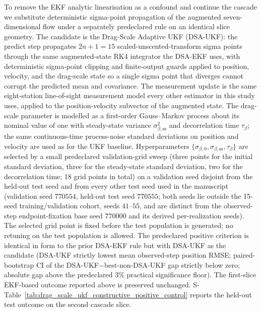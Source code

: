 \documentclass{article}
\begin{document}
To remove the EKF analytic linearisation as a confound and continue the cascade we substitute deterministic sigma-point propagation of the augmented seven-dimensional flow under a separately predeclared rule on an identical slice geometry. The candidate is the Drag-Scale Adaptive UKF (DSA-UKF): the predict step propagates $2n{+}1=15$ scaled-unscented-transform sigma points through the same augmented-state RK4 integrator the DSA-EKF uses, with deterministic sigma-point clipping and finite-output guards applied to position, velocity, and the drag-scale state so a single sigma point that diverges cannot corrupt the predicted mean and covariance. The measurement update is the same eight-station line-of-sight measurement model every other estimator in this study uses, applied to the position-velocity subvector of the augmented state. The drag-scale parameter is modelled as a first-order Gauss--Markov process about its nominal value of one with steady-state variance $\sigma_{\beta,\mathrm{ss}}^{2}$ and decorrelation time $\tau_{\beta}$; the same continuous-time process-noise standard deviations on position and velocity are used as for the UKF baseline. Hyperparameters $\{\sigma_{\beta,0},\sigma_{\beta,\mathrm{ss}},\tau_{\beta}\}$ are selected by a small predeclared validation-grid sweep (three points for the initial standard deviation, three for the steady-state standard deviation, two for the decorrelation time; 18 grid points in total) on a validation seed disjoint from the held-out test seed and from every other test seed used in the manuscript (validation seed $770554$, held-out test seed $770555$; both seeds lie outside the 15-seed training/validation cohort, seeds $41$--$55$, and are distinct from the observed-step endpoint-fixation base seed $770000$ and its derived per-realization seeds). The selected grid point is fixed before the test population is generated; no retuning on the test population is allowed. The predeclared positive criterion is identical in form to the prior DSA-EKF rule but with DSA-UKF as the candidate (DSA-UKF strictly lowest mean observed-step position RMSE; paired-bootstrap CI of the DSA-UKF$-$best-non-DSA-UKF gap strictly below zero; absolute gap above the predeclared 3\% practical significance floor). The first-slice EKF-based outcome reported above is preserved unchanged. S-Table~\ref{tab:drag_scale_ukf_constructive_positive_control} reports the held-out test outcome on the second cascade slice.


\end{document}
